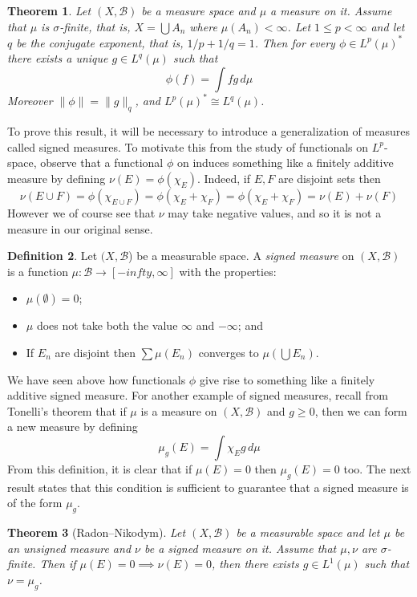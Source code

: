 \documentclass[11pt,oneside]{amsbook}
\theoremstyle{definition}
\theoremstyle{plain}
\newtheorem{thm}{Theorem}[section]
\theoremstyle{definition}
\newtheorem{defn}[thm]{Definition}
\theoremstyle{remark}
\numberwithin{equation}{section}
\numberwithin{figure}{section}
\begin{document}
\begin{thm}
  \label{thm:lpdual}
  Let $(X,\mathcal B)$ be a measure space and $\mu$ a measure on it. Assume that $\mu$ is $\sigma$-finite, that is, $X=\bigcup A_n$ where $\mu(A_n)<\infty$. Let $1\leq p<\infty$ and let $q$ be the conjugate exponent, that is, $1/p+1/q=1$. Then for every $\phi\in L^p(\mu)^*$ there exists a unique $g\in L^q(\mu)$ such that
  \[\phi(f)=\int fg\,d\mu
  \]
  Moreover $\|\phi\|=\|g\|_q$, and $L^p(\mu)^*\cong L^q(\mu)$.
\end{thm}

To prove this result, it will be necessary to introduce a generalization of measures called signed measures. To motivate this from the study of functionals on $L^p$-space, observe that a functional $\phi$ on induces something like a finitely additive measure by defining $\nu(E)=\phi(\chi_E)$. Indeed, if $E,F$ are disjoint sets then
\[\nu(E\cup F)=\phi(\chi_{E\cup F})=\phi(\chi_E+\chi_F)
  =\phi(\chi_E+\chi_F)=\nu(E)+\nu(F)
\]
However we of course see that $\nu$ may take negative values, and so it is not a measure in our original sense.

\begin{defn}
  Let $(X,\mathcal B$) be a measurable space. A \emph{signed measure} on $(X,\mathcal B)$ is a function $\mu\colon\mathcal B\to[-infty,\infty]$ with the properties:
  \begin{itemize}
  \item $\mu(\emptyset)=0$;
  \item $\mu$ does not take both the value $\infty$ and $-\infty$; and
  \item If $E_n$ are disjoint then $\sum\mu(E_n)$ converges to $\mu(\bigcup E_n)$.
  \end{itemize}
\end{defn}

We have seen above how functionals $\phi$ give rise to something like a finitely additive signed measure. For another example of signed measures, recall from Tonelli's theorem that if $\mu$ is a measure on $(X,\mathcal B)$ and $g\geq0$, then we can form a new measure by defining
\[\mu_g(E)=\int\chi_Eg\,d\mu
\]
From this definition, it is clear that if $\mu(E)=0$ then $\mu_g(E)=0$ too. The next result states that this condition is sufficient to guarantee that a signed measure is of the form $\mu_g$.

\begin{thm}[Radon--Nikodym]
  Let $(X,\mathcal B)$ be a measurable space and let $\mu$ be an unsigned measure and $\nu$ be a signed measure on it. Assume that $\mu,\nu$ are $\sigma$-finite. Then if $\mu(E)=0\implies\nu(E)=0$, then there exists $g\in L^1(\mu)$ such that $\nu=\mu_g$.
\end{thm}
\end{document}
